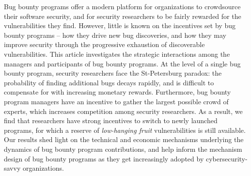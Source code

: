 Bug bounty programs offer a modern platform for organizations to crowdsource their software security, and for security researchers to be fairly rewarded for the vulnerabilities they find. However, little is known on the incentives set by bug bounty programs -- how they drive new bug discoveries, and how they may improve security through the progressive exhaustion of discoverable vulnerabilities. This article investigates the strategic interactions among the managers and participants of bug bounty programs. At the level of a single bug bounty program, security researchers face the St-Petersburg paradox: the probability of finding additional bugs decays rapidly, and is difficult to compensate for with increasing monetary rewards. Furthermore, bug bounty program managers have an incentive to gather the largest possible crowd of experts, which increases competition among security researchers. As a result, we find that researchers have strong incentives to switch to newly launched programs, for which a reserve of {\it low-hanging fruit} vulnerabilities is still available. Our results shed light on the technical and economic mechanisms underlying the dynamics of bug bounty program contributions, and help inform the mechanism design of bug bounty programs as they get increasingly adopted by cybersecurity-savvy organizations.
